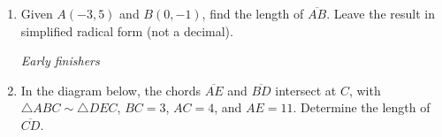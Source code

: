 \documentclass[12pt, twoside]{article}
\begin{document}
\begin{enumerate}
  \item Given $A(-3,5)$ and $B(0,-1)$, find the length of $\overline{AB}$. Leave the result in simplified radical form (not a decimal).

\newpage
\emph{Early finishers}
  \item In the diagram below, the chords $\overline{AE}$ and $\overline{BD}$ intersect at $C$, with $\triangle ABC \sim \triangle DEC$, $BC=3$, $AC=4$, and $AE=11$. Determine the length of $\overline{CD}$.
      \begin{center}
    \end{center}

\vspace{2cm}



\end{enumerate}
\end{document}
